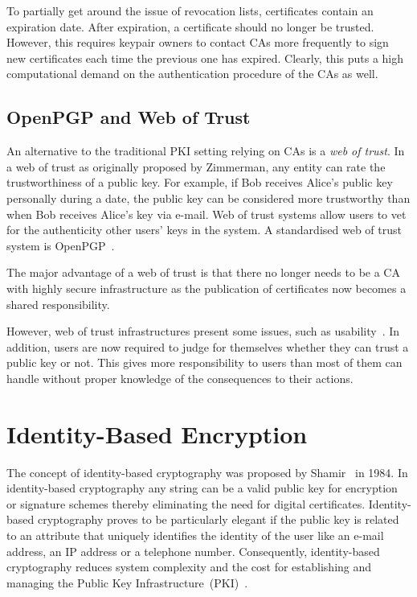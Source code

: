 To partially get around the issue of revocation lists, certificates contain an expiration date. After expiration, a certificate should no longer be trusted. However, this requires keypair owners to contact CAs more frequently to sign new certificates each time the previous one has expired. Clearly, this puts a high computational demand on the authentication procedure of the CAs as well.

\subsection{OpenPGP and Web of Trust}
\label{sec:web_of_trust}
An alternative to the traditional PKI setting relying on CAs is a \textit{web of trust}. In a web of trust as originally proposed by Zimmerman, any entity can rate the trustworthiness of a public key. For example, if Bob receives Alice's public key personally during a date, the public key can be considered more trustworthy than when Bob receives Alice's key via e-mail. Web of trust systems allow users to vet for the authenticity other users' keys in the system. A standardised web of trust system is OpenPGP~\cite{rfc4880}.

The major advantage of a web of trust is that there no longer needs to be a CA with highly secure infrastructure as the publication of certificates now becomes a shared responsibility.

However, web of trust infrastructures present some issues, such as usability~\cite{art:WhittenT99}. In addition, users are now required to judge for themselves whether they can trust a public key or not. This gives more responsibility to users than most of them can handle without proper knowledge of the consequences to their actions.

\section{Identity-Based Encryption}
The concept of identity-based cryptography was proposed by Shamir~\cite{art:Shamir84} in 1984. In identity-based cryptography any string can be a valid public key for encryption or signature schemes thereby eliminating the need for digital certificates. Identity-based cryptography proves to be particularly elegant if the public key is related to an attribute that uniquely identifies the identity of the user like an e-mail address, an IP address or a telephone number. Consequently, identity-based cryptography reduces system complexity and the cost for establishing and managing the Public Key Infrastructure~(PKI)~\cite{art:BaekNSS04}. 


